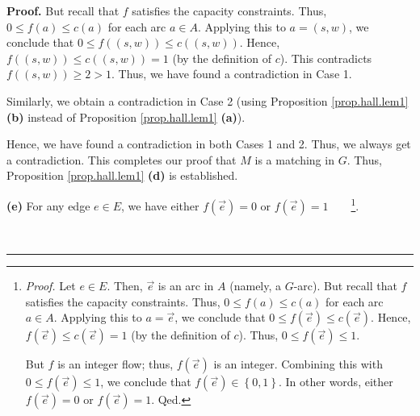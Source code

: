 \documentclass[numbers=enddot,12pt,final,onecolumn,notitlepage]{scrartcl}%
\theoremstyle{definition}
\newenvironment{proof}[1][Proof]{\noindent\textbf{#1.} }{\ \rule{0.5em}{0.5em}}
\begin{document}
\begin{proof}
But recall that $f$ satisfies the capacity constraints. Thus, $0\leq f\left(
a\right)  \leq c\left(  a\right)  $ for each arc $a\in A$. Applying this to
$a=\left(  s,w\right)  $, we conclude that $0\leq f\left(  \left(  s,w\right)
\right)  \leq c\left(  \left(  s,w\right)  \right)  $. Hence, $f\left(
\left(  s,w\right)  \right)  \leq c\left(  \left(  s,w\right)  \right)  =1$
(by the definition of $c$). This contradicts $f\left(  \left(  s,w\right)
\right)  \geq2>1$. Thus, we have found a contradiction in Case 1.

Similarly, we obtain a contradiction in Case 2 (using Proposition
\ref{prop.hall.lem1} \textbf{(b)} instead of Proposition \ref{prop.hall.lem1}
\textbf{(a)}).

Hence, we have found a contradiction in both Cases 1 and 2. Thus, we always
get a contradiction. This completes our proof that $M$ is a matching in $G$.
Thus, Proposition \ref{prop.hall.lem1} \textbf{(d)} is established.

\textbf{(e)} For any edge $e\in E$, we have either $f\left(
\overrightarrow{e}\right)  =0$ or $f\left(  \overrightarrow{e}\right)
=1$\ \ \ \ \footnote{\textit{Proof.} Let $e\in E$. Then, $\overrightarrow{e}$
is an arc in $A$ (namely, a $G$-arc). But recall that $f$ satisfies the
capacity constraints. Thus, $0\leq f\left(  a\right)  \leq c\left(  a\right)
$ for each arc $a\in A$. Applying this to $a=\overrightarrow{e}$, we conclude
that $0\leq f\left(  \overrightarrow{e}\right)  \leq c\left(
\overrightarrow{e}\right)  $. Hence, $f\left(  \overrightarrow{e}\right)  \leq
c\left(  \overrightarrow{e}\right)  =1$ (by the definition of $c$). Thus,
$0\leq f\left(  \overrightarrow{e}\right)  \leq1$.
\par
But $f$ is an integer flow; thus, $f\left(  \overrightarrow{e}\right)  $ is an
integer. Combining this with $0\leq f\left(  \overrightarrow{e}\right)  \leq
1$, we conclude that $f\left(  \overrightarrow{e}\right)  \in\left\{
0,1\right\}  $. In other words, either $f\left(  \overrightarrow{e}\right)
=0$ or $f\left(  \overrightarrow{e}\right)  =1$. Qed.}.


\end{proof}
\end{document}
